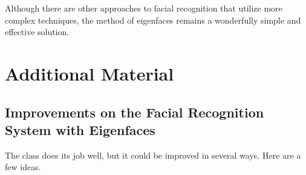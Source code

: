 Although there are other approaches to facial recognition that utilize more complex techniques, the method of eigenfaces remains a wonderfully simple and effective solution.

\newpage

\section*{Additional Material} %

\subsection*{Improvements on the Facial Recognition System with Eigenfaces} %

The  class does its job well, but it could be improved in several ways.
Here are a few ideas.
